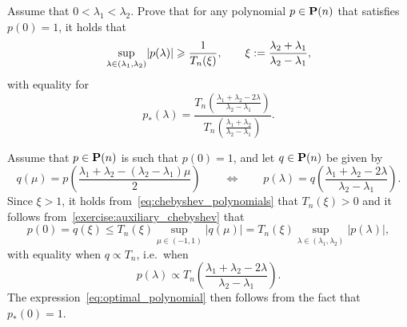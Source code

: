 \begin{exercise}
    \label{exercise:conjugate_gradient_chebyshev}
    Assume that $0 < \lambda_1 < \lambda_2$.
    Prove that for any polynomial $p \in \mathbf P(n)$ that satisfies $p(0) = 1$,
    it holds that
    \[
        \sup_{\lambda \in (\lambda_1, \lambda_2)} \lvert p(\lambda)\rvert \geqslant \frac{1}{T_n(\xi)},
        \qquad \xi := \frac{\lambda_2 + \lambda_1}{\lambda_2-  \lambda_1},
    \]
    with equality for
    \begin{equation}
        \label{eq:optimal_polynomial}
        p_*(\lambda) = \frac{T_n \left(\frac{\lambda_1 + \lambda_2 - 2\lambda}{\lambda_2 - \lambda_1} \right)}{T_n \left(\frac{\lambda_1 + \lambda_2}{\lambda_2 - \lambda_1} \right)}.
    \end{equation}
\end{exercise}
\begin{solution}
    Assume that $p \in \mathbf P(n)$ is such that $p(0) = 1$,
    and let $q \in \mathbf P(n)$ be given by
    \[
        q(\mu) = p\left(\frac{\lambda_1 + \lambda_2 - (\lambda_2 - \lambda_1) \mu}{2}\right)
        \qquad \Leftrightarrow \qquad
        p(\lambda) = q\left(\frac{\lambda_1 + \lambda_2 - 2\lambda}{\lambda_2 - \lambda_1}\right).
    \]
    Since $\xi > 1$, it holds from~\eqref{eq:chebyshev_polynomials} that $T_n(\xi) > 0$ and
    it follows from~\cref{exercise:auxiliary_chebyshev} that
    \[
        p(0) = q(\xi)
        \leq T_{n}(\xi) \sup_{\mu \in (-1, 1)} \lvert q(\mu) \rvert
        = T_{n}(\xi) \sup_{\lambda \in (\lambda_1, \lambda_2)} \lvert p(\lambda) \rvert,
    \]
    with equality when $q \propto T_n$,
    i.e.\ when
    \[
        p(\lambda) \propto T_n \left(\frac{\lambda_1 + \lambda_2 - 2\lambda}{\lambda_2 - \lambda_1} \right).
    \]
    The expression~\eqref{eq:optimal_polynomial} then follows from the fact that $p_*(0) = 1$.
\end{solution}


